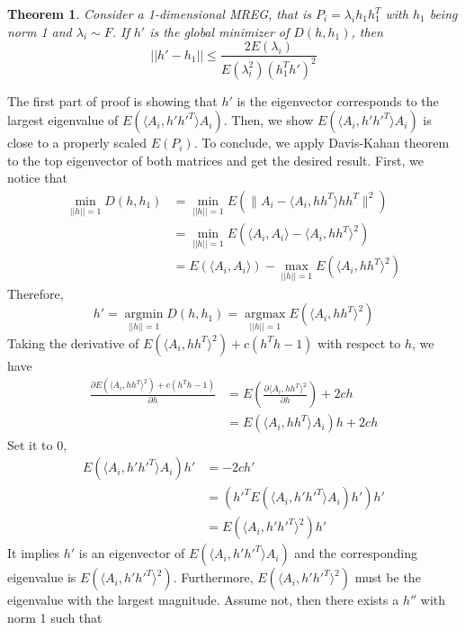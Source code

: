 \documentclass[a4paper]{article}
\newtheorem{theorem}{Theorem}[section]
\newenvironment{proof}[1][Proof]{\begin{trivlist}
\item[\hskip \labelsep {\bfseries #1}]}{\end{trivlist}}
\begin{document}
\begin{proof}
\end{proof}





\begin{theorem}
Consider a 1-dimensional MREG, that is $P_i=\lambda_i h_1 h_1 ^T$ with $h_1$ being norm 1 and $\lambda_i \sim F$. If $h'$ is the global minimizer of $D(h,h_1)$, then 
\[||h'-h_1|| \leq \frac{2 E(\lambda_i)}{E(\lambda_i^2)(h_1^T h')^2} \]
\end{theorem}
\begin{proof}
The first part of proof is showing that $h'$ is the eigenvector corresponds to the largest eigenvalue of $E(\langle A_{i},h' h'^T \rangle A_{i})$. Then, we show $E(\langle A_{i},h' h'^T \rangle A_{i})$ is close to a properly scaled $E(P_i)$. To conclude, we apply Davis-Kahan theorem to the top eigenvector of both matrices and get the desired result. First, we notice that
\begin{align*}
\underset{||h|| =1}{\operatorname{min}}D(h,h_1) &=\underset{||h|| =1}{\operatorname{min}}E(\|A_i- \langle A_i,h h^T \rangle h h^T\|^2) \\
&=\underset{||h|| =1}{\operatorname{min}}E(\langle A_i,A_i \rangle- \langle A_i,h h^T \rangle ^2) \\
&=E(\langle A_i,A_i \rangle)-\underset{||h|| =1}{\operatorname{max}}E( \langle A_i,h h^T \rangle ^2)
\end{align*}
Therefore, 
\[h'= \underset{||h|| =1}{\operatorname{argmin}}D(h,h_1)=\underset{||h|| =1}{\operatorname{argmax}} E(\langle A_i,h h^T \rangle ^2) \]
Taking the derivative of $E( \langle A_i,h h^T \rangle ^2)+ c(h^Th-1)$ with respect to $h$, we have 
\begin{align*}
\frac{\partial E( \langle A_i,h h^T \rangle ^2)+ c(h^Th-1) }{\partial h} & =  E(\frac{\partial  \langle A_i,h h^T \rangle ^2}{\partial h}) +2ch \\
&=E( \langle A_i,h h^T \rangle A_i)h +2ch 
\end{align*}
Set it to $0$,
\begin{align*} 
E( \langle A_i,h' h'^T \rangle A_i)h' & = -2ch' \\
&= (h'^T E( \langle A_i,h' h'^T \rangle A_i)h') h' \\
&= E( \langle A_i,h' h'^T \rangle ^ 2) h'
\end{align*}
It implies $h'$ is an eigenvector of $E(\langle A_{i},h' h'^T \rangle A_{i})$ and the corresponding eigenvalue is $E(\langle A_{i},h' h'^T \rangle ^2)$. Furthermore, $E(\langle A_{i},h' h'^T \rangle ^2)$ must be the eigenvalue with the largest magnitude. Assume not, then there exists a $h''$ with norm 1 such that

\end{proof}
\end{document}
